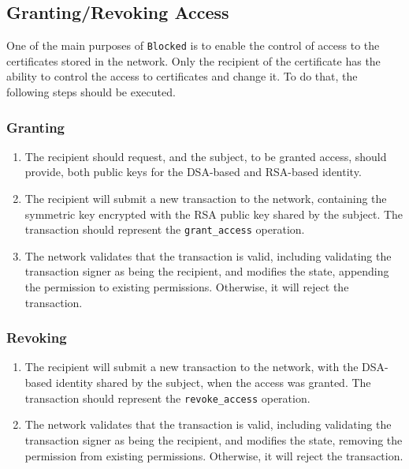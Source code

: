 \subsection{Granting/Revoking Access}

One of the main purposes of \texttt{Blocked} is to enable the control of access to the certificates stored in the network. Only the recipient of the certificate has the ability to control the access to certificates and change it. To do that, the following steps should be executed.

\subsubsection{Granting}

\begin{enumerate}
	\item The recipient should request, and the subject, to be granted access, should provide, both public keys for the DSA-based and RSA-based identity.
	\item The recipient will submit a new transaction to the network, containing the symmetric key encrypted with the RSA public key shared by the subject. The transaction should represent the \texttt{grant\_access} operation.
	\item The network validates that the transaction is valid, including validating the transaction signer as being the recipient, and modifies the state, appending the permission to existing permissions. Otherwise, it will reject the transaction.
\end{enumerate}

\subsubsection{Revoking}

\begin{enumerate}
	\item The recipient will submit a new transaction to the network, with the DSA-based identity shared by the subject, when the access was granted. The transaction should represent the \texttt{revoke\_access} operation.
	\item The network validates that the transaction is valid, including validating the transaction signer as being the recipient, and modifies the state, removing the permission from existing permissions. Otherwise, it will reject the transaction.
\end{enumerate}

